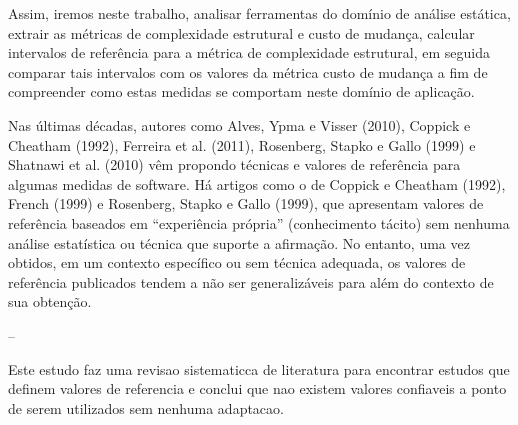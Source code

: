 Assim, iremos neste trabalho, analisar ferramentas do domínio de análise
estática, extrair as métricas de complexidade estrutural e custo de mudança,
calcular intervalos de referência para a métrica de complexidade estrutural, em
seguida comparar tais intervalos com os valores da métrica custo de mudança a
fim de compreender como estas medidas se comportam neste domínio de aplicação.

%
%
%

\cite{Lima2014}

Nas últimas décadas, autores como Alves, Ypma e Visser (2010),
Coppick e Cheatham (1992), Ferreira et al. (2011), Rosenberg, Stapko e Gallo
(1999) e Shatnawi et al. (2010) vêm propondo técnicas e valores de referência
para algumas medidas de software. Há artigos como o de Coppick e Cheatham
(1992), French (1999) e Rosenberg, Stapko e Gallo (1999), que apresentam
valores de referência baseados em “experiência própria” (conhecimento tácito)
sem nenhuma análise estatística ou técnica que suporte a afirmação. No entanto,
uma vez obtidos, em um contexto específico ou sem técnica adequada, os
valores de referência publicados tendem a não ser generalizáveis para além do
contexto de sua obtenção.

--

Este estudo faz uma revisao sistematicca de literatura para encontrar
estudos que definem valores de referencia e conclui que nao existem
valores confiaveis a ponto de serem utilizados sem nenhuma adaptacao.

